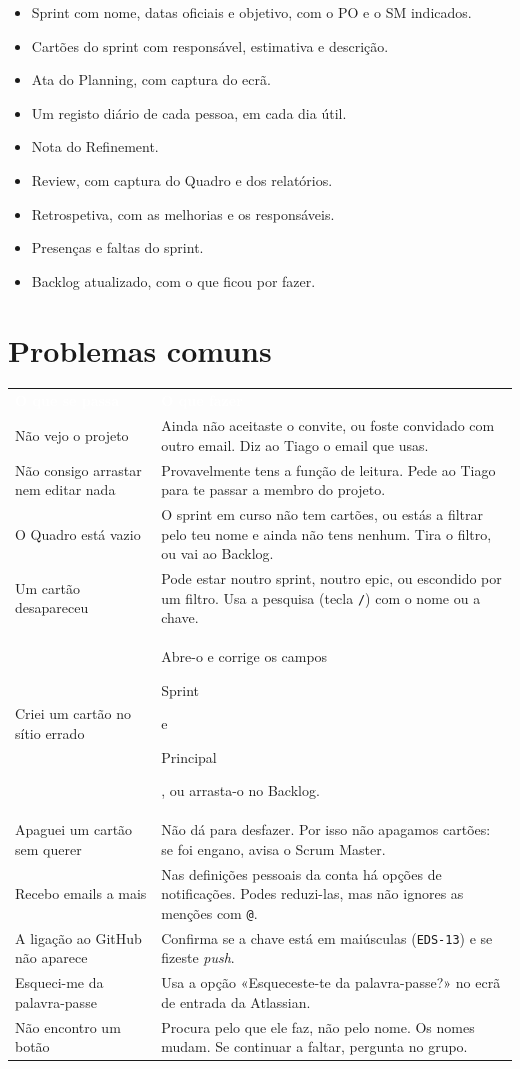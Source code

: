 \documentclass[11pt,a4paper]{article}
\newcommand{\th}[1]{\textcolor{white}{\sffamily\bfseries #1}}
\newcommand{\btn}[1]{{\setlength{\fboxsep}{1.6pt}\colorbox{azulclaro}{\sffamily\small\strut #1}}}
\newcommand{\tabelaini}{\begingroup\small\renewcommand{\arraystretch}{1.45}\rowcolors{2}{azulclaro!55}{white}}
\newcommand{\tabelafim}{\endgroup}
\begin{document}
\begin{itemize}[label=\textcolor{azul}{$\square$}]
  \item Sprint com nome, datas oficiais e objetivo, com o PO e o SM indicados.
  \item Cartões do sprint com responsável, estimativa e descrição.
  \item Ata do Planning, com captura do ecrã.
  \item Um registo diário de cada pessoa, em cada dia útil.
  \item Nota do Refinement.
  \item Review, com captura do Quadro e dos relatórios.
  \item Retrospetiva, com as melhorias e os responsáveis.
  \item Presenças e faltas do sprint.
  \item Backlog atualizado, com o que ficou por fazer.
\end{itemize}

\section{Problemas comuns}

\tabelaini
\begin{tabularx}{\textwidth}{L{4.6cm} Y}
   \th{O que se passa} & \th{O que fazer} \\
  Não vejo o projeto & Ainda não aceitaste o convite, ou foste convidado com outro email. Diz ao Tiago o email que usas. \\
  Não consigo arrastar nem editar nada & Provavelmente tens a função de leitura. Pede ao Tiago para te passar a membro do projeto. \\
  O Quadro está vazio & O sprint em curso não tem cartões, ou estás a filtrar pelo teu nome e ainda não tens nenhum. Tira o filtro, ou vai ao Backlog. \\
  Um cartão desapareceu & Pode estar noutro sprint, noutro epic, ou escondido por um filtro. Usa a pesquisa (tecla \texttt{/}) com o nome ou a chave. \\
  Criei um cartão no sítio errado & Abre-o e corrige os campos \btn{Sprint} e \btn{Principal}, ou arrasta-o no Backlog. \\
  Apaguei um cartão sem querer & Não dá para desfazer. Por isso não apagamos cartões: se foi engano, avisa o Scrum Master. \\
  Recebo emails a mais & Nas definições pessoais da conta há opções de notificações. Podes reduzi-las, mas não ignores as menções com \texttt{@}. \\
  A ligação ao GitHub não aparece & Confirma se a chave está em maiúsculas (\texttt{EDS-13}) e se fizeste \textit{push}. \\
  Esqueci-me da palavra-passe & Usa a opção «Esqueceste-te da palavra-passe?» no ecrã de entrada da Atlassian. \\
  Não encontro um botão & Procura pelo que ele faz, não pelo nome. Os nomes mudam. Se continuar a faltar, pergunta no grupo. \\
  \bottomrule
\end{tabularx}
\tabelafim
\end{document}
